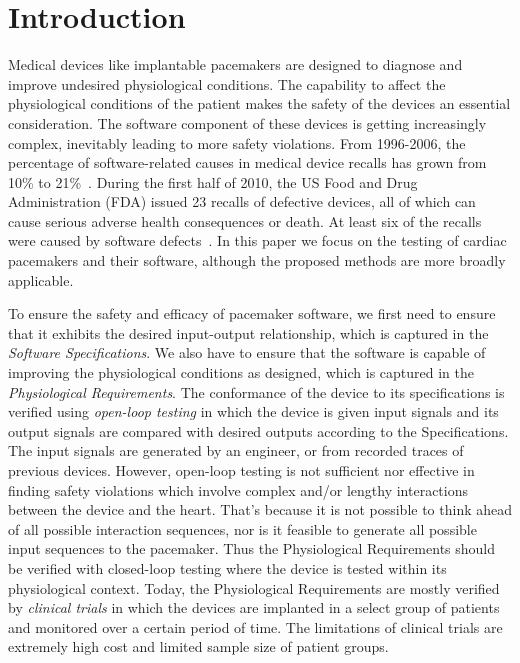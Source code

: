 \section{Introduction}
\label{introduction}

Medical devices like implantable pacemakers are designed to diagnose and improve undesired physiological conditions. The capability to affect the physiological conditions of the patient makes the safety of the devices an essential consideration. 
The software component of these devices is getting increasingly complex, inevitably leading to more safety violations.
From 1996-2006, the percentage of software-related causes in medical device recalls has grown from 10\% to 21\%~\cite{recalls}. 
During the first half of 2010, the US Food and Drug Administration (FDA) issued 23 recalls of defective devices, all of which can cause serious adverse health consequences or death. 
At least six of the recalls were caused by software defects~\cite{killedbycode}. 
In this paper we focus on the testing of cardiac pacemakers and their software, although the proposed methods are more broadly applicable.

To ensure the safety and efficacy of pacemaker software, we first need to ensure that it exhibits the desired input-output relationship, which is captured in the \emph{Software Specifications}. 
We also have to ensure that the software is capable of improving the physiological conditions as designed, which is captured in the \emph{Physiological Requirements}. 
The conformance of the device to its specifications is verified using \emph{open-loop testing} in which the device is given input signals and its output signals are compared with desired outputs according to the Specifications. 
The input signals are generated by an engineer, or from recorded traces of previous devices.
However, open-loop testing is not sufficient nor effective in finding safety violations which involve complex and/or lengthy interactions between the device and the heart.
That's because it is not possible to think ahead of all possible interaction sequences, nor is it feasible to generate all possible input sequences to the pacemaker.
Thus the Physiological Requirements should be verified with closed-loop testing where the device is tested within its physiological context. 
Today, the Physiological Requirements are mostly verified by \emph{clinical trials} in which the devices are implanted in a select group of patients and monitored over a certain period of time. 
The limitations of clinical trials are extremely high cost and limited sample size of patient groups.

